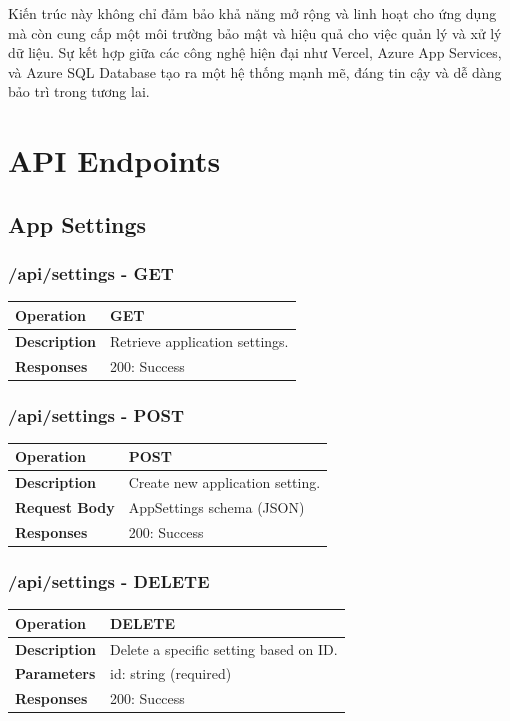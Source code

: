 Kiến trúc này không chỉ đảm bảo khả năng mở rộng và linh hoạt cho ứng dụng mà còn cung cấp một môi trường bảo mật và hiệu quả cho việc quản lý và xử lý dữ liệu. Sự kết hợp giữa các công nghệ hiện đại như Vercel, Azure App Services, và Azure SQL Database tạo ra một hệ thống mạnh mẽ, đáng tin cậy và dễ dàng bảo trì trong tương lai.

\section{API Endpoints}

\subsection{App Settings}

\subsubsection*{/api/settings - GET}
\begin{tabular}{|>{\raggedright\arraybackslash}p{3cm}|p{12cm}|}
\hline
\textbf{Operation} & GET \\
\hline
\textbf{Description} & Retrieve application settings. \\
\hline
\textbf{Responses} & 200: Success \\
\hline
\end{tabular}

\subsubsection*{/api/settings - POST}
\begin{tabular}{|>{\raggedright\arraybackslash}p{3cm}|p{12cm}|}
\hline
\textbf{Operation} & POST \\
\hline
\textbf{Description} & Create new application setting. \\
\hline
\textbf{Request Body} & AppSettings schema (JSON) \\
\hline
\textbf{Responses} & 200: Success \\
\hline
\end{tabular}

\subsubsection*{/api/settings - DELETE}
\begin{tabular}{|>{\raggedright\arraybackslash}p{3cm}|p{12cm}|}
\hline
\textbf{Operation} & DELETE \\
\hline
\textbf{Description} & Delete a specific setting based on ID. \\
\hline
\textbf{Parameters} & id: string (required) \\
\hline
\textbf{Responses} & 200: Success \\
\hline
\end{tabular}

